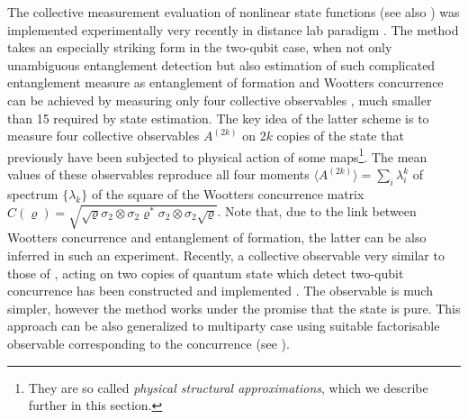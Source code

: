\documentclass[twocolumn,aps,rmp]{revtex4}
\begin{document}
The  collective measurement evaluation of nonlinear state functions
\cite{Filip,Estimator} (see also \cite{Witnesses,Fiurasek}) was
implemented experimentally very recently in distance lab paradigm \cite{NonlinExp}. The
method takes an especially striking form in the two-qubit case, when
not only unambiguous entanglement detection \cite{PHAE} but also
estimation of such complicated entanglement measure as entanglement
of formation and Wootters concurrence can be achieved by measuring
only four collective observables \cite{PHPRL}, much smaller than 15
required by state estimation. The key idea of the latter scheme is
to measure four collective observables $A^{(2k)}$ on $2k$ copies of
the state that previously have been subjected to physical action of
some maps\footnote{They are so called {\it physical structural
approximations}, which we describe further in this section.}. The
mean values of these observables reproduce all four moments $\langle
A^{(2k)}\rangle  = \sum_{i}\lambda_{i}^{k}$ of spectrum $\{
\lambda_{k} \}$ of the square of the Wootters concurrence matrix
$\hat{C}(\varrho)= \sqrt{\sqrt{\varrho} \sigma_{2}\otimes
\sigma_{2}\varrho^*\sigma_{2}\otimes \sigma_{2}\sqrt{\varrho}}$.
Note that, due to the link \cite{Wootters-conc} between Wootters
concurrence and entanglement of formation, the latter can be also
inferred in such an experiment.
Recently, a collective observable very similar to those  of
\cite{Witnesses}, acting on two copies of quantum state  which
detect two-qubit concurrence has been constructed and implemented
\cite{NatureConcurrence}. The observable is much simpler, however
the method works under the promise that the state is pure.
This approach can be also generalized to multiparty case using suitable
factorisable observable corresponding to the concurrence (see
\cite{AolitaMintert}).
\end{document}
